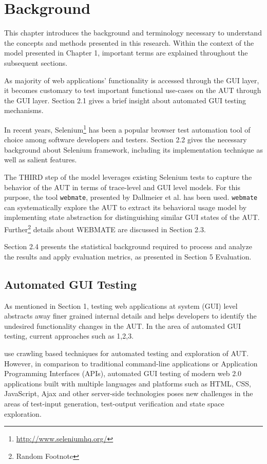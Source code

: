 \chapter{Background}
\label{Chapter2}


This chapter introduces the background and terminology necessary to understand the concepts and methods presented in this research. Within the context of the model presented in Chapter 1, important terms are explained throughout the subsequent sections.

As majority of web applications' functionality is accessed through the GUI layer, it becomes customary to test important functional use-cases on the AUT through the GUI layer. Section 2.1 gives a brief insight about automated GUI testing mechanisms.

In recent years, Selenium\footnote{\url{http://www.seleniumhq.org/}} has been a popular browser test automation tool of choice among software developers and testers. Section 2.2 gives the necessary background about Selenium framework, including its implementation technique as well as salient features.

The THIRD step of the model leverages existing Selenium tests to capture the behavior of the AUT in terms of trace-level and GUI level models. For this purpose, the tool \texttt{webmate}, presented by Dallmeier et al. has been used. \texttt{webmate} can systematically explore the AUT to extract its behavioral usage model by implementing state abstraction for distinguishing similar GUI states of the AUT. Further\footnote{Random Footnote} details about WEBMATE are discussed in Section 2.3.

Section 2.4 presents the statistical background required to process and analyze the results and apply evaluation metrics, as presented in Section 5 Evaluation.

\section{Automated GUI Testing}
\label{sec:AutomatedGUITesting}
As mentioned in Section 1, testing web applications at system (GUI) level abstracts away finer grained internal details and helps developers to identify the undesired functionality changes in the AUT.  In the area of automated GUI testing, current approaches such as  1,2,3.

use crawling based techniques for automated testing and exploration of AUT. However, in comparison to traditional command-line applications or Application Programming Interfaces (APIs), automated GUI testing of modern web 2.0 applications built with multiple languages and platforms such as HTML, CSS, JavaScript, Ajax and other server-side technologies poses new challenges in the areas of test-input generation, test-output verification and state space exploration.

